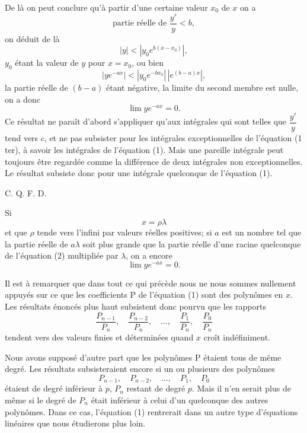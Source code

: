 \documentclass[11pt]{article}
\begin{document}
De là on peut conclure qu'à partir d'une certaine valeur $x_0$ de $x$ on a
\[
\text{partie réelle de }\frac{y'}{y}<b,
\]
on déduit de là
\[
|y|<|y_0e^{b(x-x_0)}|,
\]
$y_0$ étant la valeur de $y$ pour $x=x_0$, ou bien
\[
|ye^{-ax}|<|y_0e^{-bx_0}|\,|e^{(b-a)x}|,
\]
la partie réelle de $(b-a)$ étant négative, la limite du second membre est nulle, on a donc
\[
\lim ye^{-ax}=0.
\]
Ce résultat ne paraît d'abord s'appliquer qu'aux intégrales qui sont telles que $\dfrac{y'}{y}$ tend vers $c$, et ne pas subsister pour les intégrales exceptionnelles de l'équation (1\,ter), à savoir les intégrales de l'équation (1). Mais une pareille intégrale peut toujours être regardée comme la différence de deux intégrales non exceptionnelles. Le résultat subsiste donc pour une intégrale quelconque de l'équation (1).
\begin{flushright}C. Q. F. D.\end{flushright}

Si
\[
x=\rho\lambda
\]
et que $\rho$ tende vers l'infini par valeurs réelles positives; si $a$ est un nombre tel que la partie réelle de $a\lambda$ soit plus grande que la partie réelle d'une racine quelconque de l'équation (2) multipliée par $\lambda$, on a encore
\[
\lim ye^{-ax}=0.
\]

Il est à remarquer que dans tout ce qui précède nous ne nous sommes nullement appuyés sur ce que les coefficients P de l'équation (1) sont des polynômes en $x$. Les résultats énoncés plus haut subsistent donc pourvu que les rapports
\[
\frac{P_{n-1}}{P_n},\quad
\frac{P_{n-2}}{P_n},\quad
\ldots,\quad
\frac{P_1}{P_n},\quad
\frac{P_0}{P_n}
\]
tendent vers des valeurs finies et déterminées quand $x$ croît indéfiniment.

Nous avons supposé d'autre part que les polynômes P étaient tous de même degré. Les résultats subsisteraient encore si un ou plusieurs des polynômes
\[
P_{n-1},\quad P_{n-2},\quad \ldots,\quad P_1,\quad P_0
\]
étaient de degré inférieur à $p$, $P_n$ restant de degré $p$. Mais il n'en serait plus de même si le degré de $P_n$ était inférieur à celui d'un quelconque des autres polynômes. Dans ce cas, l'équation (1) rentrerait dans un autre type d'équations linéaires que nous étudierons plus loin.
\end{document}
